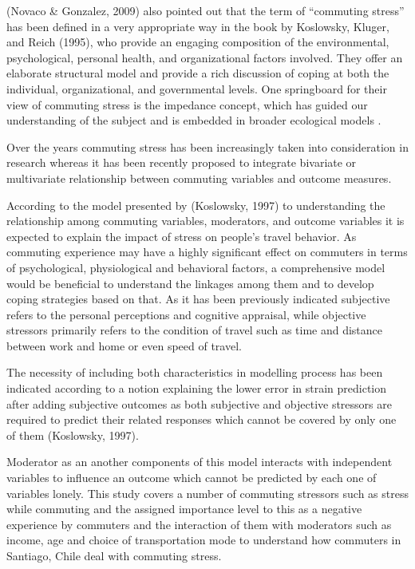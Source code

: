\documentclass[
11pt, %
oneside, %
english, %
singlespacing, %
]{macthesis} %
\begin{document}
(Novaco \& Gonzalez, 2009) also pointed out that the term of ``commuting stress'' has been defined in a very appropriate way in the book by Koslowsky, Kluger, and Reich (1995), who provide an engaging composition of the environmental, psychological, personal health, and organizational factors involved. They offer an elaborate structural model and provide a rich discussion of coping at both the individual, organizational, and governmental levels. One springboard for their view of commuting stress is the impedance concept, which has guided our understanding of the subject and is embedded in broader ecological models .

Over the years commuting stress has been increasingly taken into consideration in research whereas it has been recently proposed to integrate bivariate or multivariate relationship between commuting variables and outcome measures.

According to the model presented by (Koslowsky, 1997) to understanding the relationship among commuting variables, moderators, and outcome variables it is expected to explain the impact of stress on people's travel behavior. As commuting experience may have a highly significant effect on commuters in terms of psychological, physiological and behavioral factors, a comprehensive model would be beneficial to understand the linkages among them and to develop coping strategies based on that. As it has been previously indicated subjective refers to the personal perceptions and cognitive appraisal, while objective stressors primarily refers to the condition of travel such as time and distance between work and home or even speed of travel.

The necessity of including both characteristics in modelling process has been indicated according to a notion explaining the lower error in strain prediction after adding subjective outcomes as both subjective and objective stressors are required to predict their related responses which cannot be covered by only one of them (Koslowsky, 1997).

Moderator as an another components of this model interacts with independent variables to influence an outcome which cannot be predicted by each one of variables lonely. This study covers a number of commuting stressors such as stress while commuting and the assigned importance level to this as a negative experience by commuters and the interaction of them with moderators such as income, age and choice of transportation mode to understand how commuters in Santiago, Chile deal with commuting stress.
\end{document}
